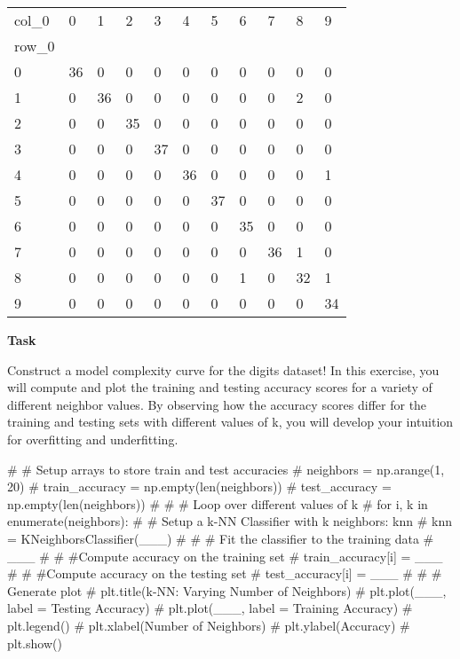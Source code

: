 \documentclass[
  letterpaper,
  DIV=11,
  numbers=noendperiod]{scrreprt}
\newenvironment{Shaded}{\begin{snugshade}}{\end{snugshade}}
\newcommand{\CommentTok}[1]{\textcolor[rgb]{0.37,0.37,0.37}{#1}}
\begin{document}
\begin{longtable}[]{@{}lllllllllll@{}}
\toprule()
col\_0 & 0 & 1 & 2 & 3 & 4 & 5 & 6 & 7 & 8 & 9 \\
row\_0 & & & & & & & & & & \\
\midrule()
\endhead
0 & 36 & 0 & 0 & 0 & 0 & 0 & 0 & 0 & 0 & 0 \\
1 & 0 & 36 & 0 & 0 & 0 & 0 & 0 & 0 & 2 & 0 \\
2 & 0 & 0 & 35 & 0 & 0 & 0 & 0 & 0 & 0 & 0 \\
3 & 0 & 0 & 0 & 37 & 0 & 0 & 0 & 0 & 0 & 0 \\
4 & 0 & 0 & 0 & 0 & 36 & 0 & 0 & 0 & 0 & 1 \\
5 & 0 & 0 & 0 & 0 & 0 & 37 & 0 & 0 & 0 & 0 \\
6 & 0 & 0 & 0 & 0 & 0 & 0 & 35 & 0 & 0 & 0 \\
7 & 0 & 0 & 0 & 0 & 0 & 0 & 0 & 36 & 1 & 0 \\
8 & 0 & 0 & 0 & 0 & 0 & 0 & 1 & 0 & 32 & 1 \\
9 & 0 & 0 & 0 & 0 & 0 & 0 & 0 & 0 & 0 & 34 \\
\bottomrule()
\end{longtable}

\textbf{Task}

Construct a model complexity curve for the digits dataset! In this
exercise, you will compute and plot the training and testing accuracy
scores for a variety of different neighbor values. By observing how the
accuracy scores differ for the training and testing sets with different
values of k, you will develop your intuition for overfitting and
underfitting.

\begin{Shaded}
\begin{Highlighting}[]
\CommentTok{\# \# Setup arrays to store train and test accuracies}
\CommentTok{\# neighbors = np.arange(1, 20)}
\CommentTok{\# train\_accuracy = np.empty(len(neighbors))}
\CommentTok{\# test\_accuracy = np.empty(len(neighbors))}
\CommentTok{\# }
\CommentTok{\# \# Loop over different values of k}
\CommentTok{\# for i, k in enumerate(neighbors):}
\CommentTok{\#     \# Setup a k{-}NN Classifier with k neighbors: knn}
\CommentTok{\#     knn = KNeighborsClassifier(\_\_\_)}
\CommentTok{\# }
\CommentTok{\#     \# Fit the classifier to the training data}
\CommentTok{\#     \_\_\_}
\CommentTok{\#     }
\CommentTok{\#     \#Compute accuracy on the training set}
\CommentTok{\#     train\_accuracy[i] = \_\_\_}
\CommentTok{\# }
\CommentTok{\#     \#Compute accuracy on the testing set}
\CommentTok{\#     test\_accuracy[i] = \_\_\_}
\CommentTok{\# }
\CommentTok{\# \# Generate plot}
\CommentTok{\# plt.title(\textquotesingle{}k{-}NN: Varying Number of Neighbors\textquotesingle{})}
\CommentTok{\# plt.plot(\_\_\_, label = \textquotesingle{}Testing Accuracy\textquotesingle{})}
\CommentTok{\# plt.plot(\_\_\_, label = \textquotesingle{}Training Accuracy\textquotesingle{})}
\CommentTok{\# plt.legend()}
\CommentTok{\# plt.xlabel(\textquotesingle{}Number of Neighbors\textquotesingle{})}
\CommentTok{\# plt.ylabel(\textquotesingle{}Accuracy\textquotesingle{})}
\CommentTok{\# plt.show()}
\end{Highlighting}
\end{Shaded}
\end{document}
